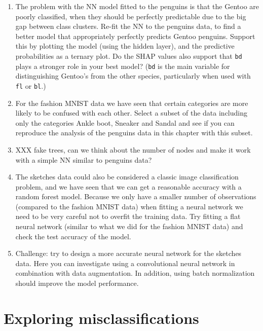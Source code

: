 \documentclass[
  letterpaper,
]{krantz}
\providecommand{\tightlist}{%
  \setlength{\itemsep}{0pt}\setlength{\parskip}{0pt}}\usepackage{longtable,booktabs,array}
\begin{document}
\begin{enumerate}
\def\labelenumi{\arabic{enumi}.}
\tightlist
\item
  The problem with the NN model fitted to the penguins is that the
  Gentoo are poorly classified, when they should be perfectly
  predictable due to the big gap between class clusters. Re-fit the NN
  to the penguins data, to find a better model that appropriately
  perfectly predicts Gentoo penguins. Support this by plotting the model
  (using the hidden layer), and the predictive probabilities as a
  ternary plot. Do the SHAP values also support that \texttt{bd} plays a
  stronger role in your best model? (\texttt{bd} is the main variable
  for distinguishing Gentoo's from the other species, particularly when
  used with \texttt{fl} or \texttt{bl}.)
\item
  For the fashion MNIST data we have seen that certain categories are
  more likely to be confused with each other. Select a subset of the
  data including only the categories Ankle boot, Sneaker and Sandal and
  see if you can reproduce the analysis of the penguins data in this
  chapter with this subset.
\item
  XXX fake trees, can we think about the number of nodes and make it
  work with a simple NN similar to penguins data?
\item
  The sketches data could also be considered a classic image
  classification problem, and we have seen that we can get a reasonable
  accuracy with a random forest model. Because we only have a smaller
  number of observations (compared to the fashion MNIST data) when
  fitting a neural network we need to be very careful not to overfit the
  training data. Try fitting a flat neural network (similar to what we
  did for the fashion MNIST data) and check the test accuracy of the
  model.
\item
  Challenge: try to design a more accurate neural network for the
  sketches data. Here you can investigate using a convolutional neural
  network in combination with data augmentation. In addition, using
  batch normalization should improve the model performance.
\end{enumerate}


\chapter{Exploring
misclassifications}\label{exploring-misclassifications}
\end{document}
